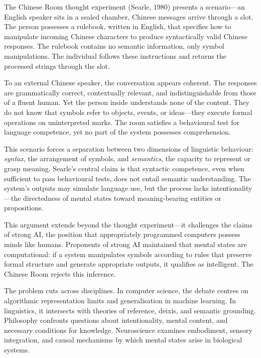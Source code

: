 The Chinese Room thought experiment (Searle, 1980) presents a scenario—an English speaker sits in a sealed chamber, Chinese messages arrive through a slot. The person possesses a rulebook, written in English, that specifies how to manipulate incoming Chinese characters to produce syntactically valid Chinese responses. The rulebook contains no semantic information, only symbol manipulations. The individual follows these instructions and returns the processed strings through the slot.

To an external Chinese speaker, the conversation appears coherent. The responses are grammatically correct, contextually relevant, and indistinguishable from those of a fluent human. Yet the person inside understands none of the content. They do not know that symbols refer to objects, events, or ideas—they execute formal operations on uninterpreted marks. The room satisfies a behavioural test for language competence, yet no part of the system possesses comprehension.

This scenario forces a separation between two dimensions of linguistic behaviour: \textit{syntax}, the arrangement of symbols, and \textit{semantics}, the capacity to represent or grasp meaning. Searle's central claim is that syntactic competence, even when sufficient to pass behavioural tests, does not entail semantic understanding. The system's outputs may simulate language use, but the process lacks intentionality—the directedness of mental states toward meaning-bearing entities or propositions.

This argument extends beyond the thought experiment—it challenges the claims of \QSOpen{}strong AI,\QSClose{} the position that appropriately programmed computers possess minds like humans. Proponents of strong AI maintained that mental states are computational: if a system manipulates symbols according to rules that preserve formal structure and generate appropriate outputs, it qualifies as intelligent. The Chinese Room rejects this inference.

The problem cuts across disciplines. In computer science, the debate centres on algorithmic representation limits and generalisation in machine learning. In linguistics, it intersects with theories of reference, deixis, and semantic grounding. Philosophy confronts questions about intentionality, mental content, and necessary conditions for knowledge. Neuroscience examines embodiment, sensory integration, and causal mechanisms by which mental states arise in biological systems.

